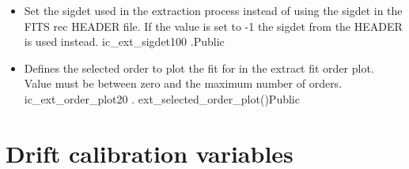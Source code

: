 \begin{itemize}
\item {}
{Set the sigdet used in the extraction process instead of using the sigdet in the FITS rec HEADER file. If the value is set to -1 the sigdet from the HEADER is used instead.}
{ic\_ext\_sigdet}{100}
{\calextractRAW}{\constantsfile}{\calextractRAW.\progMAIN}{Public}

\item {}
{Defines the selected order to plot the fit for in the extract fit order plot. Value must be between zero and the maximum number of orders.}
{ic\_ext\_order\_plot}{20}
{\calextractRAW}{\constantsfile}{\spirouPlot. ext\_selected\_order\_plot()}{Public}

\end{itemize}







\clearpage
\newpage
\section{Drift calibration variables}
\label{ch:variables:drift}

